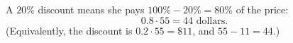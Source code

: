 A $20\%$ discount means she pays $100\%-20\%=80\%$ of the price:
\[0.8\cdot55=\boxed{44}\text{ dollars}.\]
(Equivalently, the discount is $0.2\cdot55=\$11$, and $55-11=44$.)
